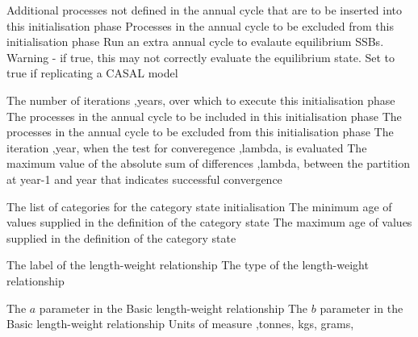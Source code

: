  {Additional processes not defined in the annual cycle that are to be inserted into this initialisation phase}
 {Processes in the annual cycle to be excluded from this initialisation phase}
 {Run an extra annual cycle to evalaute equilibrium SSBs. Warning - if true, this may not correctly evaluate the equilibrium state. Set to true if replicating a CASAL model}
\par\textbf{}\par
{} {The number of iterations ,years, over which to execute this initialisation phase}
 {The processes in the annual cycle to be included in this initialisation phase}
 {The processes in the annual cycle to be excluded from this initialisation phase}
 {The iteration ,year, when the test for converegence ,lambda, is evaluated}
 {The maximum value of the absolute sum of differences ,lambda, between the partition at year-1 and year that indicates successful convergence}
\par\textbf{}\par
{} {The list of categories for the category state initialisation}
 {The minimum age of values supplied in the definition of the category state}
 {The maximum age of values supplied in the definition of the category state}
\par\par
{} {The label of the length-weight relationship}
 {The type of the length-weight relationship}
\par\textbf{}\par
{} {The $a$ parameter in the Basic length-weight relationship}
 {The $b$ parameter in the Basic length-weight relationship}
 {Units of measure ,tonnes, kgs, grams,}
\par\textbf{}\par
{}\par\par
\par\textbf{}\par

